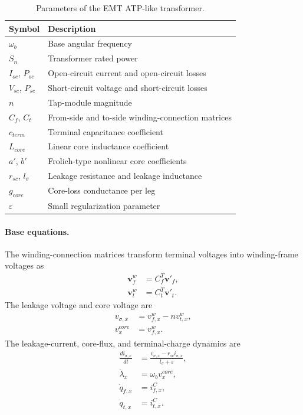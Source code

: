 \begin{table}[H]
    \centering
    \caption{Parameters of the EMT ATP-like transformer.}
    \begin{tabular}{ll}
        \toprule
        Symbol & Description \\
        \midrule
        $\omega_b$ & Base angular frequency \\
        $S_n$ & Transformer rated power \\
        $I_{oc}$, $P_{oc}$ & Open-circuit current and open-circuit losses \\
        $V_{sc}$, $P_{sc}$ & Short-circuit voltage and short-circuit losses \\
        $n$ & Tap-module magnitude \\
        $C_f$, $C_t$ & From-side and to-side winding-connection matrices \\
        $c_{term}$ & Terminal capacitance coefficient \\
        $L_{core}$ & Linear core inductance coefficient \\
        $a'$, $b'$ & Frolich-type nonlinear core coefficients \\
        $r_{sc}$, $l_\sigma$ & Leakage resistance and leakage inductance \\
        $g_{core}$ & Core-loss conductance per leg \\
        $\varepsilon$ & Small regularization parameter \\
        \bottomrule
    \end{tabular}
\end{table}

\paragraph{Base equations.}
The winding-connection matrices transform terminal voltages into winding-frame voltages as
\begin{align}
    \mathbf{v}^w_f &= C_f^T\mathbf{v}'_f, \\
    \mathbf{v}^w_t &= C_t^T\mathbf{v}'_t.
\end{align}
The leakage voltage and core voltage are
\begin{align}
    v_{\sigma,x} &= v^w_{f,x}-n v^w_{t,x}, \\
    v^{core}_x &= v^w_{f,x}.
\end{align}
The leakage-current, core-flux, and terminal-charge dynamics are
\begin{align}
    \frac{d i_{\sigma,x}}{dt} &= \frac{v_{\sigma,x}-r_{sc}i_{\sigma,x}}{l_\sigma+\varepsilon}, \\
    \dot{\lambda}_x &= \omega_b v^{core}_x, \\
    \dot{q}_{f,x} &= i^C_{f,x}, \\
    \dot{q}_{t,x} &= i^C_{t,x}.
\end{align}

